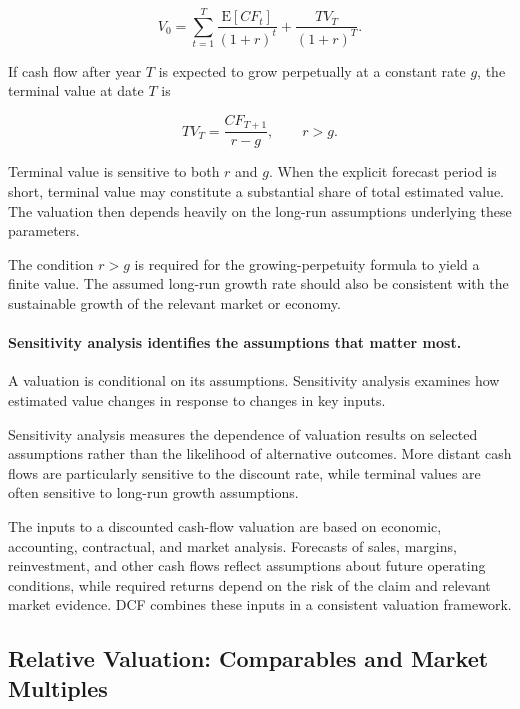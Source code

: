 \begin{equation}
V_0=\sum_{t=1}^{T}
\frac{\mathrm{E}[CF_t]}{(1+r)^t}+\frac{TV_T}{(1+r)^T}.
\label{eq:ch5-dcf-terminal}
\end{equation}

If cash flow after year $T$ is expected to grow perpetually at a constant rate $g$, the terminal value at date $T$ is

\begin{equation}
TV_T=\frac{CF_{T+1}}{r-g},
\qquad r>g.
\label{eq:ch5-growing-perpetuity}
\end{equation}

Terminal value is sensitive to both $r$ and $g$. When the explicit forecast period is short, terminal value may constitute a substantial share of total estimated value. The valuation then depends heavily on the long-run assumptions underlying these parameters.

The condition $r>g$ is required for the growing-perpetuity formula to yield a finite value. The assumed long-run growth rate should also be consistent with the sustainable growth of the relevant market or economy.

\paragraph{Sensitivity analysis identifies the assumptions that matter most.}

A valuation is conditional on its assumptions. Sensitivity analysis examines how estimated value changes in response to changes in key inputs.

Sensitivity analysis measures the dependence of valuation results on selected assumptions rather than the likelihood of alternative outcomes. More distant cash flows are particularly sensitive to the discount rate, while terminal values are often sensitive to long-run growth assumptions.

The inputs to a discounted cash-flow valuation are based on economic, accounting, contractual, and market analysis. Forecasts of sales, margins, reinvestment, and other cash flows reflect assumptions about future operating conditions, while required returns depend on the risk of the claim and relevant market evidence. DCF combines these inputs in a consistent valuation framework.

\subsection{Relative Valuation: Comparables and Market Multiples}


